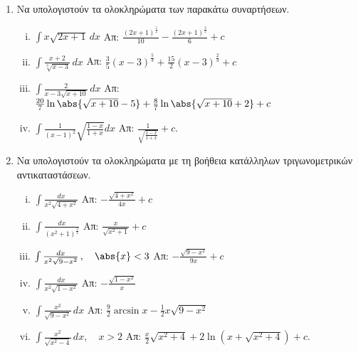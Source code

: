 \begin{enumerate}
  \item Να υπολογιστούν τα ολοκληρώματα των παρακάτω συναρτήσεων.
    \begin{enumerate}[i)]
      \item $\int x\sqrt{2x+1}\,dx$ 
        \hfill Απ: $\frac{(2x+1)^{\frac{5}{2}}}{10}-\frac{(2x+1)^{\frac{3}{2}}}{6}+c$
      \item $\int\frac{x+2}{\sqrt[3]{x-3}}\,dx$ 
        \hfill Απ: $\frac{3}{5}(x-3)^{\frac{5}{3}}+\frac{15}{2}(x-3)^{\frac{2}{3}}+c$
      \item $\int\frac{2}{x-3\sqrt{x+10}}\,dx$ 
        \hfill Απ: $\frac{20}{7}\ln\abs{\sqrt{x+10}-5}+\frac{8}{7}\ln
        \abs{\sqrt{x+10}+2}+c$
      \item $\int\frac{1}{(x-1)^2}\sqrt{\frac{1-x}{1+x}}dx$
        \hfill Απ: $\frac{1}{\sqrt{\frac{1-x}{1+x}}}+c$.
    \end{enumerate}

  \item Να υπολογιστούν τα ολοκληρώματα με τη βοήθεια κατάλληλων τριγωνομετρικών 
    αντικαταστάσεων.
    \begin{enumerate}[i)]
      \item $\int\frac{dx}{x^2\sqrt{4+x^2}}$ \hfill Απ: $-\frac{\sqrt{4+x^2}}{4x}+c$
      \item $\int\frac{dx}{(x^2+1)^{\frac{3}{2}}}$ \hfill Απ: $\frac{x}{\sqrt{x^2+1}}+c$
      \item $\int\frac{dx}{x^2\sqrt{9-x^2}}\,,\quad \abs{x}<3$ 
        \hfill Απ: $-\frac{\sqrt{9-x^2}}{9x}+c$
      \item $\int \frac{dx}{x^{2}\sqrt{1-x^{2}}}$ \hfill Απ: $-\frac{\sqrt{1-x^{2}}}{x}$
      \item $ \int \frac{x^{2}}{\sqrt{9-x^{2}}} \,{dx} $ \hfill Απ: $ \frac{9}{2}
        \arcsin{x} - \frac{1}{2} x \sqrt{9-x^{2}} $  
      \item $\int\frac{x^2}{\sqrt{x^2-4}}\,dx,\quad x>2$ 
        \hfill Απ: $\frac{x}{2}\sqrt{x^2+4}+2\ln(x+\sqrt{x^2+4})+c$.
    \end{enumerate}
\end{enumerate}




